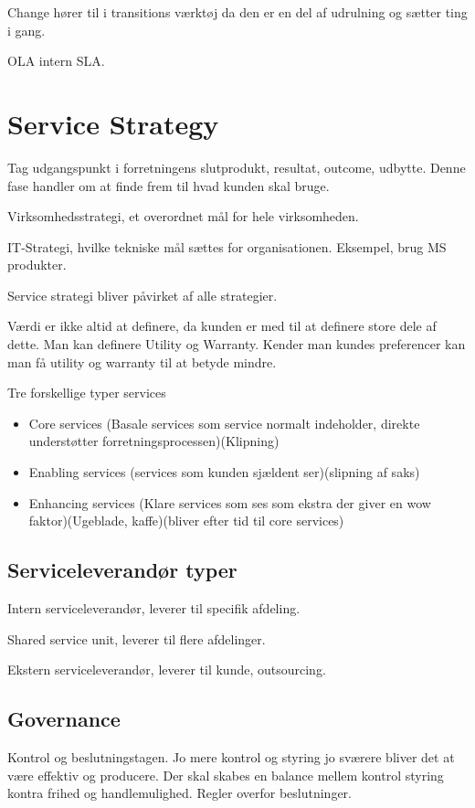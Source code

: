 Change hører til i transitions værktøj da den er en del af udrulning og sætter ting i gang.

OLA intern SLA.

\section{Service Strategy}
Tag udgangspunkt i forretningens slutprodukt, resultat, outcome, udbytte.
Denne fase handler om at finde frem til hvad kunden skal bruge.

Virksomhedsstrategi, et overordnet mål for hele virksomheden.

IT-Strategi, hvilke tekniske mål sættes for organisationen. Eksempel, brug MS produkter.

Service strategi bliver påvirket af alle strategier.

Værdi er ikke altid at definere, da kunden er med til at definere store dele af dette. Man kan definere Utility og Warranty.
Kender man kundes preferencer kan man få utility og warranty til at betyde mindre. 

Tre forskellige typer services

\begin{itemize}
\item Core services (Basale services som service normalt indeholder, direkte understøtter forretningsprocessen)(Klipning)
\item Enabling services (services som kunden sjældent ser)(slipning af saks)
\item Enhancing services (Klare services som ses som ekstra der giver en wow faktor)(Ugeblade, kaffe)(bliver efter tid til core services)
\end{itemize}

\subsection{Serviceleverandør typer}
Intern serviceleverandør, leverer til specifik afdeling.

Shared service unit, leverer til flere afdelinger.

Ekstern serviceleverandør, leverer til kunde, outsourcing.

\subsection{Governance}
Kontrol og beslutningstagen. Jo mere kontrol og styring jo sværere bliver det at være effektiv og producere. Der skal skabes en balance mellem kontrol styring kontra frihed og handlemulighed. Regler overfor beslutninger.

